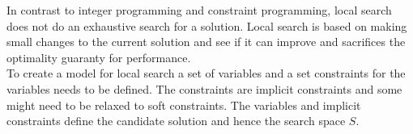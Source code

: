In contrast to integer programming and constraint programming, local search does not do an exhaustive 
search for a solution. Local search is based on making small changes to the current solution and 
see if it can improve and sacrifices the optimality guaranty for performance. \\ 
To create a model for local search a set of variables and a set constraints for the variables needs to be defined. The 
constraints are implicit constraints and some might need to be relaxed to soft constraints. The variables and implicit 
constraints define the candidate solution and hence the search space $S$.
